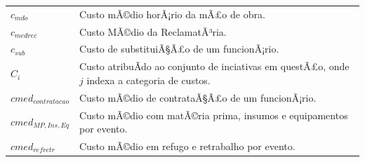 \documentclass[]{article}
\begin{document}
\begin{longtable}[]{@{}ll@{}}
\begin{minipage}[t]{0.07\columnwidth}
\(c_{mdo}\)\strut
\end{minipage} & \begin{minipage}[t]{0.87\columnwidth}\raggedright\strut
Custo mÃ©dio horÃ¡rio da mÃ£o de obra.\strut
\end{minipage}\tabularnewline
\begin{minipage}[t]{0.07\columnwidth}\raggedright\strut
\(c_{medrec}\)\strut
\end{minipage} & \begin{minipage}[t]{0.87\columnwidth}\raggedright\strut
Custo MÃ©dio da ReclamatÃ³ria.\strut
\end{minipage}\tabularnewline
\begin{minipage}[t]{0.07\columnwidth}\raggedright\strut
\(c_{sub}\)\strut
\end{minipage} & \begin{minipage}[t]{0.87\columnwidth}\raggedright\strut
Custo de substituiÃ§Ã£o de um funcionÃ¡rio.\strut
\end{minipage}\tabularnewline
\begin{minipage}[t]{0.07\columnwidth}\raggedright\strut
\(C_i\)\strut
\end{minipage} & \begin{minipage}[t]{0.87\columnwidth}\raggedright\strut
Custo atribuÃ­do ao conjunto de inciativas em questÃ£o, onde \(j\)
indexa a categoria de custos.\strut
\end{minipage}\tabularnewline
\begin{minipage}[t]{0.07\columnwidth}\raggedright\strut
\(cmed_{contratacao}\)\strut
\end{minipage} & \begin{minipage}[t]{0.87\columnwidth}\raggedright\strut
Custo mÃ©dio de contrataÃ§Ã£o de um funcionÃ¡rio.\strut
\end{minipage}\tabularnewline
\begin{minipage}[t]{0.07\columnwidth}\raggedright\strut
\(cmed_{MP, Ins, Eq}\)\strut
\end{minipage} & \begin{minipage}[t]{0.87\columnwidth}\raggedright\strut
Custo mÃ©dio com matÃ©ria prima, insumos e equipamentos por
evento.\strut
\end{minipage}\tabularnewline
\begin{minipage}[t]{0.07\columnwidth}\raggedright\strut
\(cmed_{refretr}\)\strut
\end{minipage} & \begin{minipage}[t]{0.87\columnwidth}\raggedright\strut
Custo mÃ©dio em refugo e retrabalho por evento.\strut

\end{minipage}
\end{longtable}
\end{document}
